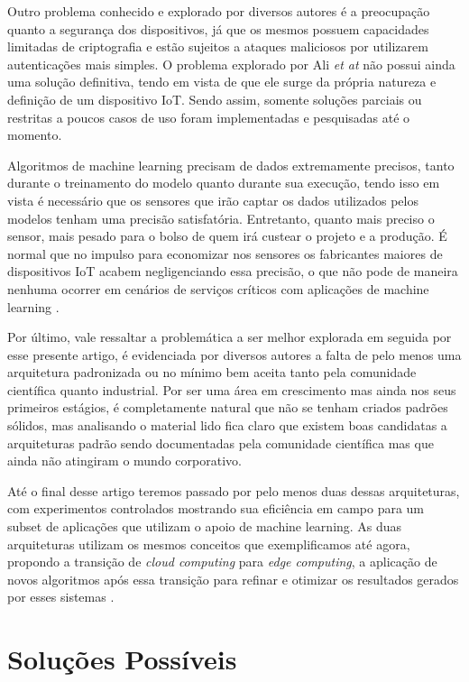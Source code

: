 \documentclass[12pt]{article}
\begin{document}
Outro problema conhecido e explorado por diversos autores é a preocupação quanto a segurança dos dispositivos, já que os mesmos possuem capacidades limitadas de criptografia e estão sujeitos a ataques maliciosos por utilizarem autenticações mais simples. O problema explorado por Ali \emph{et at} \cite{ali} não possui ainda uma solução definitiva, tendo em vista de que ele surge da própria natureza e definição de um dispositivo IoT. Sendo assim, somente soluções parciais ou restritas a poucos casos de uso foram implementadas e pesquisadas até o momento.

Algoritmos de machine learning precisam de dados extremamente precisos, tanto durante o treinamento do modelo quanto durante sua execução, tendo isso em vista é necessário que os sensores que irão captar os dados utilizados pelos modelos tenham uma precisão satisfatória. Entretanto, quanto mais preciso o sensor, mais pesado para o bolso de quem irá custear o projeto e a produção. É normal que no impulso para economizar nos sensores os fabricantes maiores de dispositivos IoT acabem negligenciando essa precisão, o que não pode de maneira nenhuma ocorrer em cenários de serviços críticos com aplicações de machine learning \cite{sacco}.

Por último, vale ressaltar a problemática a ser melhor explorada em seguida por esse presente artigo, é evidenciada por diversos autores \cite{sacco} \cite{ali} a falta de pelo menos uma arquitetura padronizada ou no mínimo bem aceita tanto pela comunidade científica quanto industrial. Por ser uma área em crescimento mas ainda nos seus primeiros estágios, é completamente natural que não se tenham criados padrões sólidos, mas analisando o material lido fica claro que existem boas candidatas a arquiteturas padrão sendo documentadas pela comunidade científica mas que ainda não atingiram o mundo corporativo.

Até o final desse artigo teremos passado por pelo menos duas dessas arquiteturas, com experimentos controlados mostrando sua eficiência em campo para um subset de aplicações que utilizam o apoio de machine learning. As duas arquiteturas utilizam os mesmos conceitos que exemplificamos até agora, propondo a transição de \emph{cloud computing} para \emph{edge computing}, a aplicação de novos algoritmos após essa transição para refinar e otimizar os resultados gerados por esses sistemas \cite{sacco}.

\section{Soluções Possíveis}
\end{document}
